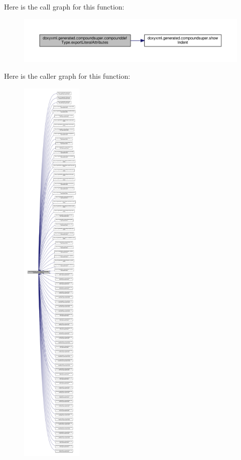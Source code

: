 Here is the call graph for this function\+:
\nopagebreak
\begin{figure}[H]
\begin{center}
\leavevmode
\includegraphics[width=350pt]{dc/d6a/classdoxyxml_1_1generated_1_1compoundsuper_1_1compounddefType_acce51fd5a019fd4eed19560a71322e5d_cgraph}
\end{center}
\end{figure}




Here is the caller graph for this function\+:
\nopagebreak
\begin{figure}[H]
\begin{center}
\leavevmode
\includegraphics[height=550pt]{dc/d6a/classdoxyxml_1_1generated_1_1compoundsuper_1_1compounddefType_acce51fd5a019fd4eed19560a71322e5d_icgraph}
\end{center}
\end{figure}


